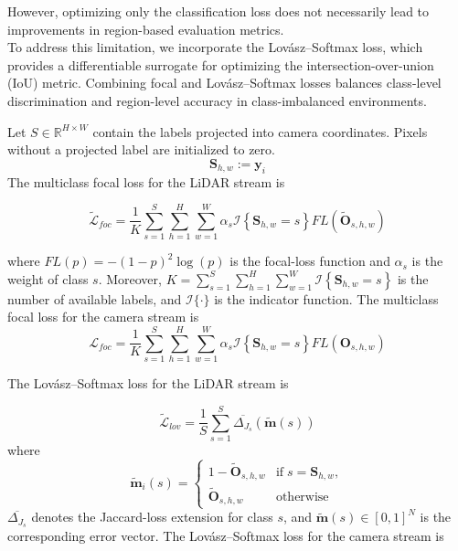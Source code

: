 However, optimizing only the classification loss does not necessarily lead to improvements in region-based evaluation metrics. \\

To address this limitation, we incorporate the Lovász--Softmax loss, which provides a differentiable surrogate for optimizing the intersection-over-union (IoU) metric. Combining focal and Lovász--Softmax losses balances class-level discrimination and region-level accuracy in class-imbalanced environments.

Let $S \in \mathbb{R}^{H \times W}$ contain the labels projected into camera coordinates. Pixels without a projected label are initialized to zero.
\begin{equation}
	\mathbf{S}_{h,w} := \mathbf{y}_i
\end{equation}
The multiclass focal loss for the LiDAR stream is

\begin{equation}
	\mathcal{\tilde{L}}_{foc} = \frac{1}{K}\sum_{s=1}^{S}\sum_{h=1}^{H}\sum_{w=1}^{W}\alpha_s \mathcal{I}\left \{ \mathbf{S}_{h,w} = s \right \} FL(\mathbf{\tilde{O}}_{s,h,w})
\end{equation}

where $FL(p) = -(1-p)^2\log(p)$ is the focal-loss function and $\alpha_s$ is the weight of class $s$. Moreover, $K = \sum_{s=1}^{S}\sum_{h=1}^{H}\sum_{w=1}^{W} \mathcal{I}\left\{\mathbf{S}_{h,w}=s\right\}$ is the number of available labels, and $\mathcal{I}\{\cdot\}$ is the indicator function. The multiclass focal loss for the camera stream is
\begin{equation}
	\mathcal{L}_{foc} = \frac{1}{K}\sum_{s=1}^{S}\sum_{h=1}^{H}\sum_{w=1}^{W}\alpha_s \mathcal{I}\left \{ \mathbf{S}_{h,w} = s \right \} FL(\mathbf{O}_{s,h,w})
\end{equation}

The Lovász--Softmax loss for the LiDAR stream is

\begin{equation}
	\mathcal{\tilde{L}}_{lov} = \frac{1}{S}\sum_{s=1}^{S}\overline{\Delta_{J_s}}(\mathbf{\tilde{m}}(s))
\end{equation}
where
\begin{equation}
	\mathbf{\tilde{m}}_i(s) = \begin{cases}
		1 - \mathbf{\tilde{O}}_{s,h,w}  & \text{if} \; s = \mathbf{S}_{h,w}, \\
		\mathbf{\tilde{O}}_{s,h,w} & \text{otherwise}
	\end{cases} 
\end{equation}
$\overline{\Delta_{J_s}}$ denotes the Jaccard-loss extension for class $s$, and $\mathbf{\tilde{m}}(s) \in [0,1]^N$ is the corresponding error vector. The Lovász--Softmax loss for the camera stream is

